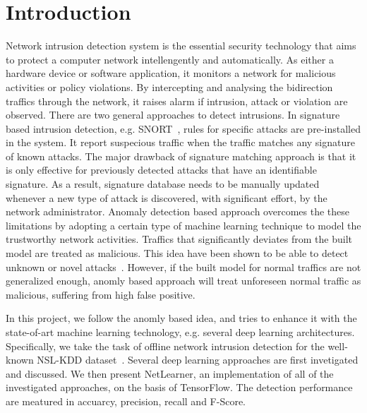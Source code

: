 \section{Introduction}

Network intrusion detection system is the essential security technology that
aims to protect a computer network intellengently and automatically.
As either a hardware device or software application,
it monitors a network for malicious activities or policy violations.
By intercepting and analysing the bidirection traffics through the network,
it raises alarm if intrusion, attack or violation are observed.
There are two general approaches to detect intrusions.
In signature based intrusion detection, e.g. SNORT~\cite{Snort},
rules for specific attacks are pre-installed in the system.
It report suspecious traffic when the traffic matches any signature of known attacks.
The major drawback of signature matching approach is that
it is only effective for previously detected attacks that have an identifiable signature.
As a result, signature database needs to be manually updated whenever a new type of attack
is discovered, with significant effort, by the network administrator.
Anomaly detection based approach overcomes the these limitations by adopting a certain
type of machine learning technique to model the trustworthy network activities.
Traffics that significantly deviates from the built model are treated as malicious.
This idea have been shown to be able to detect unknown or novel attacks~\cite{NSL-KDD, STL-NIDS}.
However, if the built model for normal traffics are not generalized enough,
anomly based approach will treat unforeseen normal traffic as malicious,
suffering from high false positive.

In this project, we follow the anomly based idea, and tries to enhance it with the
state-of-art machine learning technology, e.g. several deep learning architectures.
Specifically, we take the task of offline network intrusion detection for the well-known
NSL-KDD dataset~\cite{NSL-KDD}.
Several deep learning approaches are first invetigated and discussed.
We then present NetLearner, an implementation of all of the investigated approaches,
on the basis of TensorFlow.
The detection performance are meatured in accuarcy, precision, recall and F-Score.
